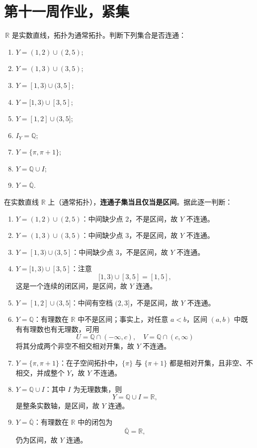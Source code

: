 \section{第十一周作业，紧集}
\begin{homework}[4.5]
$\,\mathbb R$ 是实数直线，拓扑为通常拓扑。判断下列集合是否连通：

\begin{enumerate}
    \item $Y=(1,2)\cup(2,5)$;
    \item $Y=(1,3)\cup(3,5)$;
    \item $Y=[1,3)\cup(3,5]$;
    \item $Y=[1,3)\cup[3,5]$;
    \item $Y=[1,2]\cup(3,5]$;
    \item $I_Y=\mathbb Q$;
    \item $Y=\{\pi,\pi+1\}$;
    \item $Y=\mathbb Q\cup I$;
    \item $Y=\overline{\mathbb Q}$.
\end{enumerate}
\end{homework}
\begin{solution}
在实数直线 $\mathbb{R}$ 上（通常拓扑），\textbf{连通子集当且仅当是区间}。据此逐一判断：

\begin{enumerate}
  \item $Y=(1,2)\cup(2,5)$：中间缺少点 $2$，不是区间，故 $Y$ 不连通。

  \item $Y=(1,3)\cup(3,5)$：中间缺少点 $3$，不是区间，故 $Y$ 不连通。

  \item $Y=[1,3)\cup(3,5]$：中间缺少点 $3$，不是区间，故 $Y$ 不连通。

  \item $Y=[1,3)\cup[3,5]$：注意
  \[
    [1,3)\cup[3,5]=[1,5],
  \]
  这是一个连续的闭区间，是区间，故 $Y$ 连通。

  \item $Y=[1,2]\cup(3,5]$：中间有空档 $(2,3]$，不是区间，故 $Y$ 不连通。

  \item $Y=\mathbb{Q}$：有理数在 $\mathbb{R}$ 中不是区间；事实上，对任意 $a<b$，区间 $(a,b)$ 中既有有理数也有无理数，可用
  \[
    U=\mathbb{Q}\cap(-\infty,c),\quad V=\mathbb{Q}\cap(c,\infty)
  \]
  将其分成两个非空不相交相对开集，故 $Y$ 不连通。

  \item $Y=\{\pi,\pi+1\}$：在子空间拓扑中，$\{\pi\}$ 与 $\{\pi+1\}$ 都是相对开集，且非空、不相交，并成整个 $Y$，故 $Y$ 不连通。

  \item $Y=\mathbb{Q}\cup I$：其中 $I$ 为无理数集，则
  \[
    Y=\mathbb{Q}\cup I=\mathbb{R},
  \]
  是整条实数轴，是区间，故 $Y$ 连通。

  \item $Y=\overline{\mathbb{Q}}$：有理数在 $\mathbb{R}$ 中的闭包为
  \[
    \overline{\mathbb{Q}}=\mathbb{R},
  \]
  仍为区间，故 $Y$ 连通。
\end{enumerate}
\end{solution}
